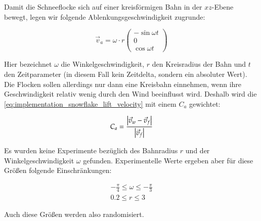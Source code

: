 Damit die Schneeflocke sich auf einer kreisförmigen Bahn in der
$xz$-Ebene bewegt, legen wir folgende Ablenkungsgeschwindigkeit zugrunde:

\begin{equation}
\label{eq:implementation_snowflake_lift_velocity}
\vec{v}_{a} =
\omega \cdot r
\left(
\begin{array}{c}
-\sin{\omega t} \\
0 \\
\cos{\omega t}
\end{array}
\right)
\end{equation}

Hier bezeichnet $\omega$ die Winkelgeschwindigkeit, $r$ den
Kreisradius der Bahn und $t$ den Zeitparameter (in diesem Fall kein
Zeitdelta, sondern ein absoluter Wert). Die Flocken sollen allerdings
nur dann eine Kreisbahn einnehmen, wenn ihre Geschwindigkeit relativ
wenig durch den Wind beeinflusst wird. Deshalb wird die
\autoref{eq:implementation_snowflake_lift_velocity} mit einem $C_a$
gewichtet:

\begin{equation}
C_a =
\frac
{
  \left|\vec{v}_w - \vec{v}_f\right|
}
{
  \left|\vec{v}_f\right|
}
\end{equation}

Es wurden keine Experimente bezüglich des Bahnradius $r$ und der
Winkelgeschwindigkeit $\omega$ gefunden. Experimentelle Werte ergeben
aber für diese Größen folgende Einschränkungen:

\begin{gather}
-\frac{\pi}{4} \leq \omega \leq -\frac{\pi}{3} \\
0.2 \leq r \leq 3
\end{gather}

Auch diese Größen werden also randomisiert.

